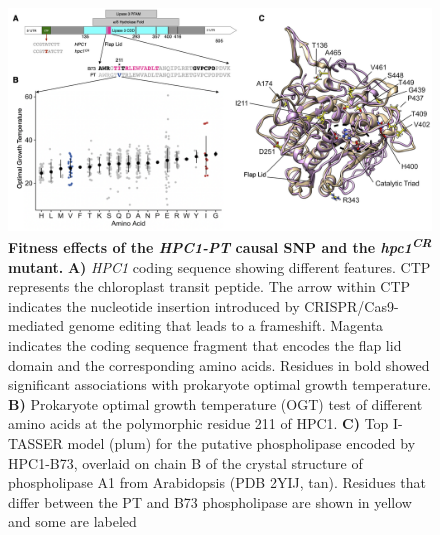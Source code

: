 \documentclass[9pt,twocolumn,twoside,lineno]{BioRxiv}
\begin{document}
\begin{figure}[!ht]
\begin{center}
\includegraphics[width=0.8\paperwidth]{Figures/Fig_5.png}
\caption{\textbf{Fitness effects of the \textit{HPC1-PT} causal SNP and the \textit{hpc1\textsuperscript{CR}} mutant.} 
\textbf{A)} \textit{HPC1} coding sequence showing different features. 
CTP represents the chloroplast transit peptide. 
The arrow within CTP indicates the nucleotide insertion introduced by CRISPR/Cas9-mediated genome editing that leads to a frameshift.
Magenta indicates the coding sequence fragment that encodes the flap lid domain and the corresponding amino acids.
Residues in bold showed significant associations with prokaryote optimal growth temperature.
\textbf{B)} Prokaryote optimal growth temperature (OGT) test of different amino acids at the polymorphic residue 211 of HPC1.
\textbf{C)} Top I-TASSER model (plum) for the putative phospholipase encoded by HPC1-B73, overlaid on chain B of the crystal structure of phospholipase A1 from
Arabidopsis (PDB 2YIJ, tan). 
Residues that differ between the PT and B73 phospholipase are shown in yellow and some are labeled} 
\label{Fig5}
\end{center}
\end{figure}
\end{document}
